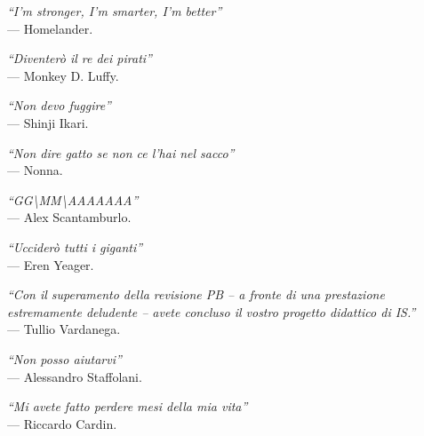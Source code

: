 \cleardoublepage
{}
{}

\begin{flushright}{
    \slshape
    ``I'm stronger, I'm smarter, I'm better''} \\
    \medskip
    --- Homelander.
\end{flushright}

\begin{flushright}{
    \slshape
    ``Diventerò il re dei pirati''} \\
    \medskip
    --- Monkey D. Luffy.
\end{flushright}

\begin{flushright}{
    \slshape
    ``Non devo fuggire''} \\
    \medskip
    --- Shinji Ikari.
\end{flushright}
\begin{flushright}{
    \slshape
    ``Non dire gatto se non ce l'hai nel sacco''} \\
    \medskip
    --- Nonna.
\end{flushright}
\begin{flushright}{
    \slshape
    ``GG\textbackslash{}MM\textbackslash{}AAAAAAA''} \\
    \medskip
    --- Alex Scantamburlo.
\end{flushright}

\begin{flushright}{
    \slshape
    ``Ucciderò tutti i giganti''} \\
    \medskip
    --- Eren Yeager.
\end{flushright}


\begin{flushright}{
    \slshape
    ``Con il superamento della revisione PB -- a fronte di una prestazione estremamente deludente -- avete concluso il vostro progetto didattico di IS.''} \\
    \medskip
    --- Tullio Vardanega.
\end{flushright}

\begin{flushright}{
    \slshape
    ``Non posso aiutarvi''} \\
    \medskip
    --- Alessandro Staffolani.
\end{flushright}

\begin{flushright}{
    \slshape
    ``Mi avete fatto perdere mesi della mia vita''} \\
    \medskip
    --- Riccardo Cardin.
\end{flushright}



